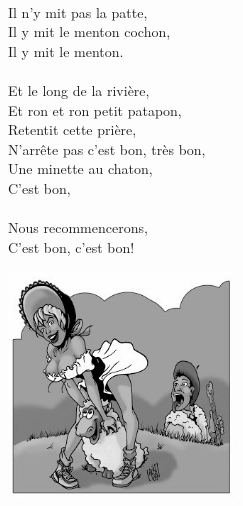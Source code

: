 {\\Il n'y mit pas la patte,
\\Il y mit le menton cochon,
\\Il y mit le menton.
\\\\Et le long de la rivière,
\\Et ron et ron petit patapon,
\\Retentit cette prière,
\\N'arrête pas c'est bon, très bon,
\\Une minette au chaton,
\\C'est bon,
\\\\Nous recommencerons, 
\\C'est bon, c'est bon!
\begin{center}
\includegraphics[width=0.45\textwidth]{images/bergere.jpg}
\end{center}
}

\breakpage